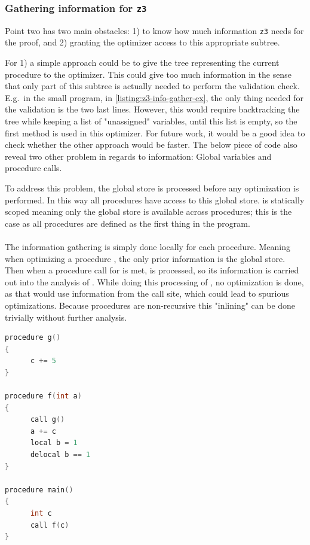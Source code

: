 \subsubsection{Gathering information for \texttt{z3} }
Point two has two main obstacles: 1) to know how much information \texttt{z3} needs for the proof,
and 2) granting the optimizer access to this appropriate subtree.

For 1) a simple approach could be to give the tree representing the current procedure to the
optimizer. This could give too much information in the sense that only part of this subtree is
actually needed to perform the validation check. E.g.\ in the small program, in
\autoref{listing:z3-info-gather-ex}, the only thing
needed for the validation is the two last lines. However, this would require backtracking the
tree while keeping a list of "unassigned" variables, until this list is empty, so the first
method is used in this optimizer. For future work, it would be a good idea to check whether the
other approach would be faster. The below piece of code also reveal two other problem in regards
to information: Global variables and procedure calls.

To address this problem, the global store is processed before any optimization is performed.
In this way all procedures have access to this global store. \lan is statically scoped meaning
only the global store is available across procedures; this is the case as all procedures are
defined as the first thing in the program.
\\
\\
The information gathering is simply done locally for each procedure. Meaning when optimizing
a procedure , the only prior information is the global store. Then when a procedure
call for  is met,  is processed, so its information is carried out into
the analysis of . While doing this processing of , no optimization is done,
as that would use information from the call site, which could lead to spurious optimizations.
Because procedures are non-recursive this "inlining" can be done trivially without further
analysis.

\begin{lstlisting}[language=C++, label=listing:z3-info-gather-ex,
    caption=Example on gathering information for \texttt{z3} where only last two lines are needed.]
procedure g()
{
      c += 5
}

procedure f(int a)
{
      call g()
      a += c
      local b = 1
      delocal b == 1
}

procedure main()
{
      int c
      call f(c)
}
\end{lstlisting}

